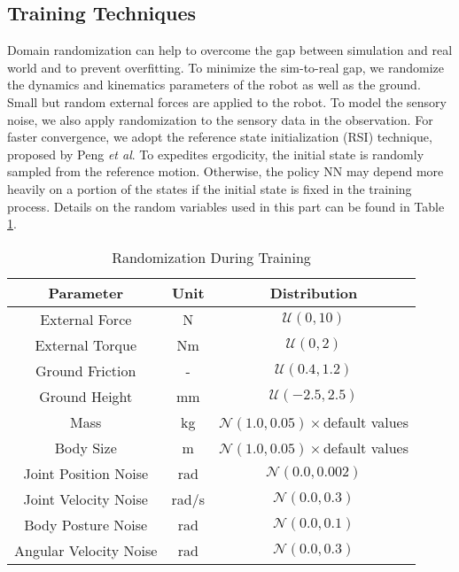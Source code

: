 \documentclass[letterpaper, 10 pt, journal, twoside]{IEEEtran} %
\begin{document}
\subsection{Training Techniques}
Domain randomization can help to overcome the gap between simulation and real world and to prevent overfitting\cite{Hwangboeaau5872,siekmann2020learning}. To minimize the sim-to-real gap, we randomize the dynamics and kinematics parameters of the robot as well as the ground. Small but random external forces are applied to the robot. To model the sensory noise, we also apply randomization to the sensory data in the observation. For faster convergence, we adopt the reference state initialization (RSI) technique, proposed by Peng \textit{et al}.\cite{2018-TOG-deepMimic} To expedites ergodicity, the initial state is randomly sampled from the reference motion. Otherwise, the policy NN may depend more heavily on a portion of the states if the initial state is fixed in the training process. Details on the random variables used in this part can be found in Table \ref{method_table_2}.
\begin{table}[!t]
	\renewcommand{\arraystretch}{1.3}
	\caption{Randomization During Training}
	\label{method_table_2}
	\centering
	\begin{tabular}{|c|c|c|}
		\hline
		Parameter & Unit & Distribution\\
		\hline
		External Force & N & $\mathcal{U}\left(0, 10\right)$\\
		\hline
		External Torque & Nm & $\mathcal{U}\left(0, 2\right)$\\
		\hline
		Ground Friction & - & $\mathcal{U}\left(0.4, 1.2\right)$\\
		\hline
		Ground Height & mm & $\mathcal{U}\left(-2.5, 2.5\right)$\\
		\hline
		Mass & kg & $\mathcal{N}\left(1.0, 0.05\right)\times$default values\\
		\hline
		Body Size & m & $\mathcal{N}\left(1.0, 0.05\right)\times$default values\\
		\hline
		Joint Position Noise & rad & $\mathcal{N}\left(0.0, 0.002\right)$\\
		\hline
		Joint Velocity Noise & rad/s & $\mathcal{N}\left(0.0, 0.3\right)$\\
		\hline
		Body Posture Noise & rad & $\mathcal{N}\left(0.0, 0.1\right)$\\
		\hline
		Angular Velocity Noise & rad & $\mathcal{N}\left(0.0, 0.3\right)$\\
		\hline
	\end{tabular}
\end{table}
\end{document}
